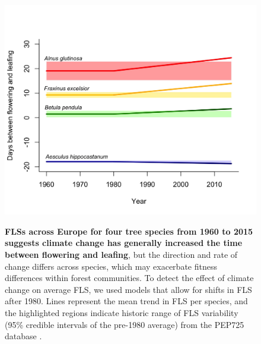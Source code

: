 \documentclass[11.5 pt]{article}\usepackage[]{graphicx}\usepackage[]{color}
\begin{document}
   \begin{figure}[ht!]
   \centering
 \includegraphics[width=\textwidth]{..//PEP725/FLS_climate_change.jpeg}\\
\caption{\textbf{FLSs across Europe for four tree species from 1960 to 2015 suggests climate change has generally increased the time between flowering and leafing}, but the direction and rate of change differs across species, which may exacerbate fitness differences within forest communities. To detect the effect of climate change on average FLS, we used models that allow for shifts in FLS after 1980. Lines represent the mean trend in FLS per species, and the highlighted regions indicate historic range of FLS variability (95\% credible intervals of the pre-1980 average) from the PEP725 database \citep{PEP725}.}
    \label{fig:climchange}
    \end{figure}
    

\clearpage



\end{document}
